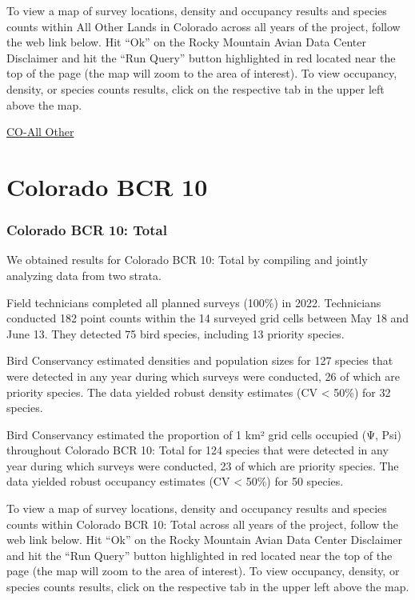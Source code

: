 \documentclass[
  letterpaper,
  DIV=11,
  numbers=noendperiod,
  oneside]{scrreprt}
\begin{document}
To view a map of survey locations, density and occupancy results and
species counts within All Other Lands in Colorado across all years of
the project, follow the web link below. Hit ``Ok'' on the Rocky Mountain
Avian Data Center Disclaimer and hit the ``Run Query'' button
highlighted in red located near the top of the page (the map will zoom
to the area of interest). To view occupancy, density, or species counts
results, click on the respective tab in the upper left above the map.

\href{http://www.rmbo.org/new_site/adc/QueryWindow.aspx\#N4IgzgrgDgpgTmALnAhoiBbEAuABCAYQHkBaAQQBsLcjEALeEAXyA===}{CO-All
Other}

\hypertarget{colorado-bcr-10}{%
\section{Colorado BCR 10}\label{colorado-bcr-10}}

\hypertarget{colorado-bcr-10-total}{%
\subsubsection{Colorado BCR 10: Total}\label{colorado-bcr-10-total}}

We obtained results for Colorado BCR 10: Total by compiling and jointly
analyzing data from two strata.

Field technicians completed all planned surveys (100\%) in 2022.
Technicians conducted 182 point counts within the 14 surveyed grid cells
between May 18 and June 13. They detected 75 bird species, including 13
priority species.

Bird Conservancy estimated densities and population sizes for 127
species that were detected in any year during which surveys were
conducted, 26 of which are priority species. The data yielded robust
density estimates (CV \textless{} 50\%) for 32 species.

Bird Conservancy estimated the proportion of 1 km² grid cells occupied
(Ψ, Psi) throughout Colorado BCR 10: Total for 124 species that were
detected in any year during which surveys were conducted, 23 of which
are priority species. The data yielded robust occupancy estimates (CV
\textless{} 50\%) for 50 species.

To view a map of survey locations, density and occupancy results and
species counts within Colorado BCR 10: Total across all years of the
project, follow the web link below. Hit ``Ok'' on the Rocky Mountain
Avian Data Center Disclaimer and hit the ``Run Query'' button
highlighted in red located near the top of the page (the map will zoom
to the area of interest). To view occupancy, density, or species counts
results, click on the respective tab in the upper left above the map.
\end{document}
